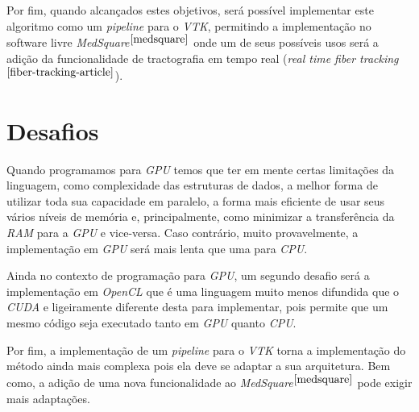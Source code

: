 Por fim, quando alcançados estes objetivos, será possível implementar este algoritmo como um \textit{pipeline} para o \textit{VTK}, permitindo a implementação no software livre \textit{MedSquare}$^{\ref{medsquare}}$ onde um de seus possíveis usos será a adição da funcionalidade de tractografia em tempo real (\textit{real time fiber tracking}$^{\ref{fiber-tracking-article}}$).

\newpage
\section{Desafios}
Quando programamos para \textit{GPU} temos que ter em mente certas limitações da linguagem, como complexidade das estruturas de dados, a melhor forma de utilizar toda sua capacidade em paralelo, a forma mais eficiente de usar seus vários níveis de memória e, principalmente, como minimizar a transferência da \textit{RAM} para a \textit{GPU} e vice-versa. Caso contrário, muito provavelmente, a implementação em \textit{GPU} será mais lenta que uma para \textit{CPU}.

Ainda no contexto de programação para \textit{GPU}, um segundo desafio será a implementação em \textit{OpenCL} que é uma linguagem muito menos difundida que o \textit{CUDA} e ligeiramente diferente desta para implementar, pois permite que um mesmo código seja executado tanto em \textit{GPU} quanto \textit{CPU}.

Por fim, a implementação de um \textit{pipeline} para o \textit{VTK} torna a implementação do método ainda mais complexa pois ela deve se adaptar a sua arquitetura. Bem como, a adição de uma nova funcionalidade ao \textit{MedSquare}$^{\ref{medsquare}}$ pode exigir mais adaptações.
